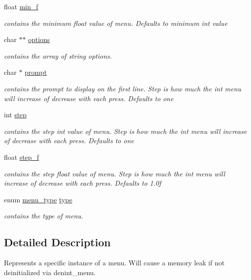 \begin{DoxyCompactItemize}
float \hyperlink{structmenu__t_a0a6e4f711992fb69e8a57c2af1ab7a05}{min\+\_\+f}
\begin{DoxyCompactList}\small\item\em contains the minimum float value of menu. Defaults to minimum int value \end{DoxyCompactList}\item 
char $\ast$$\ast$ \hyperlink{structmenu__t_ad695cd88051e34817f0f582d4e43c33a}{options}
\begin{DoxyCompactList}\small\item\em contains the array of string options. \end{DoxyCompactList}\item 
char $\ast$ \hyperlink{structmenu__t_a7bf29a030b7ed4a623c6b445587cc647}{prompt}
\begin{DoxyCompactList}\small\item\em contains the prompt to display on the first line. Step is how much the int menu will increase of decrease with each press. Defaults to one \end{DoxyCompactList}\item 
int \hyperlink{structmenu__t_adc50450bc59ea66a8d67424adc46e24e}{step}
\begin{DoxyCompactList}\small\item\em contains the step int value of menu. Step is how much the int menu will increase of decrease with each press. Defaults to one \end{DoxyCompactList}\item 
float \hyperlink{structmenu__t_a84cfd9226f6554c63ca9f4b11f94d12d}{step\+\_\+f}
\begin{DoxyCompactList}\small\item\em contains the step float value of menu. Step is how much the int menu will increase of decrease with each press. Defaults to 1.\+0f \end{DoxyCompactList}\item 
enum \hyperlink{menu_8h_a6bbf4baf5018b0d76aab6c2e6bf85e62}{menu\+\_\+type} \hyperlink{structmenu__t_a110244ceb7d2a7cba95cfc5758d61c01}{type}
\begin{DoxyCompactList}\small\item\em contains the type of menu. \end{DoxyCompactList}\end{DoxyCompactItemize}


\subsection{Detailed Description}
Represents a specific instance of a menu. Will cause a memory leak if not deinitialized via denint\+\_\+menu. 


